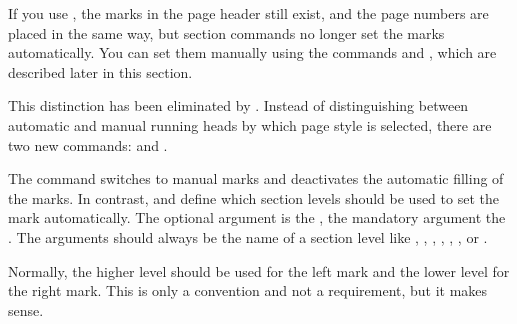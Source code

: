 {\begin{Explain}
      If you use %
      , the marks in the page header still exist, and the page
      numbers are placed in the same way, but section commands no longer set
      the marks automatically. You can set them manually using the commands
       and
      , which are described later
      in this section.
    \end{Explain}\par%
    This distinction has been eliminated by %
    \iffalse \Package{scrpage2} and now also by \fi%
    \hyperref[cha:scrlayer]{}. Instead
    of distinguishing between automatic and manual running heads by which page style is selected, there
    are two new commands:  and .%
  }{%
  }%

  The  command switches to
  manual marks and deactivates the automatic filling of the marks. In contrast,
   and  define
  which section levels should be used to set the mark automatically. The
  optional argument is the , the
  mandatory argument the . The
  arguments should always be the name of a section level like
  , , , ,
  , , or .

  Normally, the higher level should be used for the left mark and the lower
  level for the right mark. This is only a convention and not a requirement,
  but it makes sense.

